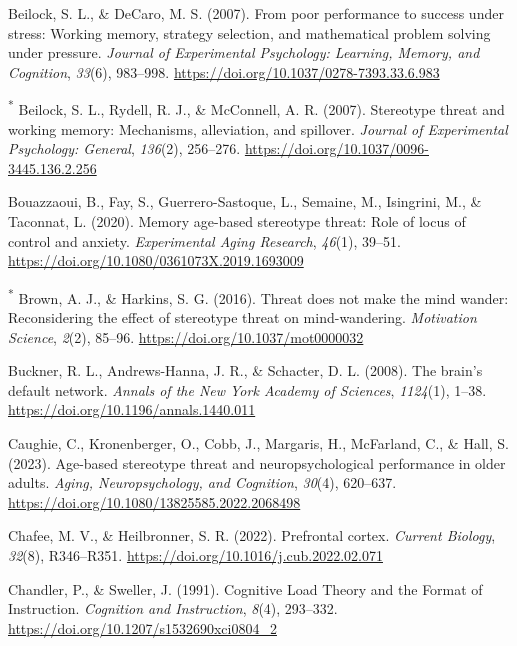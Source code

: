 \documentclass[
  stu, a4paper,floatsintext]{apa7}
\newlength{\cslhangindent}
\newenvironment{CSLReferences}[2] %
 {\begin{list}{}{%
  \setlength{\itemindent}{0pt}
  \setlength{\leftmargin}{0pt}
  \setlength{\parsep}{0pt}
  \ifodd #1
   \setlength{\leftmargin}{\cslhangindent}
   \setlength{\itemindent}{-1\cslhangindent}
  \fi
  \setlength{\itemsep}{#2\baselineskip}}}
 {\end{list}}
\begin{document}
\begin{CSLReferences}{1}{0}
Beilock, S. L., \& DeCaro, M. S. (2007). From poor performance to success under stress: {Working} memory, strategy selection, and mathematical problem solving under pressure. \emph{Journal of Experimental Psychology: Learning, Memory, and Cognition}, \emph{33}(6), 983--998. \url{https://doi.org/10.1037/0278-7393.33.6.983}

\textsuperscript{*} Beilock, S. L., Rydell, R. J., \& McConnell, A. R. (2007). Stereotype threat and working memory: {Mechanisms}, alleviation, and spillover. \emph{Journal of Experimental Psychology: General}, \emph{136}(2), 256--276. \url{https://doi.org/10.1037/0096-3445.136.2.256}

Bouazzaoui, B., Fay, S., Guerrero-Sastoque, L., Semaine, M., Isingrini, M., \& Taconnat, L. (2020). Memory age-based stereotype threat: {Role} of locus of control and anxiety. \emph{Experimental Aging Research}, \emph{46}(1), 39--51. \url{https://doi.org/10.1080/0361073X.2019.1693009}

\textsuperscript{*} Brown, A. J., \& Harkins, S. G. (2016). Threat does not make the mind wander: {Reconsidering} the effect of stereotype threat on mind-wandering. \emph{Motivation Science}, \emph{2}(2), 85--96. \url{https://doi.org/10.1037/mot0000032}

Buckner, R. L., Andrews-Hanna, J. R., \& Schacter, D. L. (2008). The brain's default network. \emph{Annals of the New York Academy of Sciences}, \emph{1124}(1), 1--38. \url{https://doi.org/10.1196/annals.1440.011}

Caughie, C., Kronenberger, O., Cobb, J., Margaris, H., McFarland, C., \& Hall, S. (2023). Age-based stereotype threat and neuropsychological performance in older adults. \emph{Aging, Neuropsychology, and Cognition}, \emph{30}(4), 620--637. \url{https://doi.org/10.1080/13825585.2022.2068498}

Chafee, M. V., \& Heilbronner, S. R. (2022). Prefrontal cortex. \emph{Current Biology}, \emph{32}(8), R346--R351. \url{https://doi.org/10.1016/j.cub.2022.02.071}

Chandler, P., \& Sweller, J. (1991). Cognitive {Load Theory} and the {Format} of {Instruction}. \emph{Cognition and Instruction}, \emph{8}(4), 293--332. \url{https://doi.org/10.1207/s1532690xci0804_2}


\end{CSLReferences}
\end{document}
